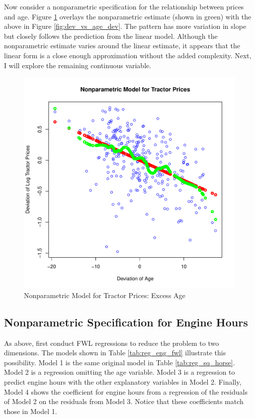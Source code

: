 \documentclass[11pt]{paper}
\begin{document}
\clearpage
Now consider a nonparametric specification for 
the relationship between prices and age.
Figure \ref{fig:dev_np_vs_age_dev} 
overlays the nonparametric estimate (shown in green) with the above in 
Figure \ref{fig:dev_vs_age_dev}.
The pattern has more variation in slope but 
closely follows the prediction from the linear model. 
Although the nonparametric estimate varies around the linear estimate,
it appears that the linear form
is a close enough approximation without the added complexity.
Next, I will explore the remaining continuous variable.


\begin{figure}[h!]
  \centering
  \includegraphics[scale = 0.5, keepaspectratio=true]{../Figures/dev_np_vs_age_dev}
  \caption{Nonparametric Model for Tractor Prices: Excess Age} \label{fig:dev_np_vs_age_dev}
\end{figure}





\clearpage
\subsection{Nonparametric Specification for Engine Hours}

As above, first conduct FWL regressions 
to reduce the problem to two dimensions. 
The models shown in
Table \ref{tab:reg_eng_fwl}
illustrate this possibility. 
Model 1 is the same original model in 
Table \ref{tab:reg_sq_horse}. 
Model 2 is a regression omitting the age variable. 
Model 3 is a regression to predict engine hours with the other explanatory variables in Model 2.
Finally, Model 4 shows the coefficient for engine hours
from a regression of the residuals of Model 2
on the residuals from Model 3. 
Notice that these coefficients match those in Model 1. 
\end{document}
